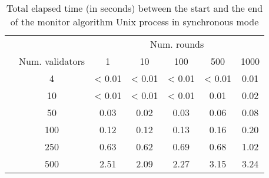 \documentclass[a4paper,11pt,oneside]{report}
\begin{document}
\begin{table}[]
\centering
\begin{tabular}{l|c|c|c|c|c|c|}
\cline{2-7}
                  &   & \multicolumn{5}{c|}{Num. rounds} \\ \cline{2-7} 
\multirow{7}{*}{} & Num. validators & 1   & 10   & 100  & 500  & 1000  \\ \cline{2-7} 
                  & 4               & < 0.01  & < 0.01  & < 0.01 &  < 0.01 & 0.01      \\ \cline{2-7} 
                  & 10              & < 0.01    & < 0.01     &   < 0.01   & 0.01  & 0.02      \\ \cline{2-7} 
                  & 50              & 0.03    &  0.02    & 0.03     &  0.06    &  0.08     \\ \cline{2-7} 
                  & 100             & 0.12  & 0.12    & 0.13  & 0.16     & 0.20      \\ \cline{2-7} 
                  & 250             &  0.63   & 0.62     &  0.69    &  0.68    &  1.02     \\ \cline{2-7} 
                  & 500             & 2.51    & 2.09     &  2.27    &  3.15    & 3.24      \\ \cline{2-7} 
\end{tabular}
\caption{Total elapsed time (in seconds) between the start and the end of the monitor algorithm Unix process in synchronous mode}
\end{table}
\end{document}
